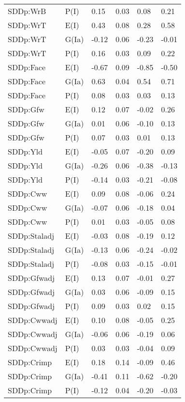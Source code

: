 \begin{center}
\begin{longtable}{|p{1.1in}|p{0.7in}|p{0.7in}|p{0.6in}|p{0.6in}|p{0.6in}|}
  SDDp:WrB & P(I) & 0.15 & 0.03 & 0.08 & 0.21 \\ 
  SDDp:WrT & E(I) & 0.43 & 0.08 & 0.28 & 0.58 \\ 
  SDDp:WrT & G(Ia) & -0.12 & 0.06 & -0.23 & -0.01 \\ 
  SDDp:WrT & P(I) & 0.16 & 0.03 & 0.09 & 0.22 \\ 
  SDDp:Face & E(I) & -0.67 & 0.09 & -0.85 & -0.50 \\ 
  SDDp:Face & G(Ia) & 0.63 & 0.04 & 0.54 & 0.71 \\ 
  SDDp:Face & P(I) & 0.08 & 0.03 & 0.03 & 0.13 \\ 
  SDDp:Gfw & E(I) & 0.12 & 0.07 & -0.02 & 0.26 \\ 
  SDDp:Gfw & G(Ia) & 0.01 & 0.06 & -0.10 & 0.13 \\ 
  SDDp:Gfw & P(I) & 0.07 & 0.03 & 0.01 & 0.13 \\ 
  SDDp:Yld & E(I) & -0.05 & 0.07 & -0.20 & 0.09 \\ 
  SDDp:Yld & G(Ia) & -0.26 & 0.06 & -0.38 & -0.13 \\ 
  SDDp:Yld & P(I) & -0.14 & 0.03 & -0.21 & -0.08 \\ 
  SDDp:Cww & E(I) & 0.09 & 0.08 & -0.06 & 0.24 \\ 
  SDDp:Cww & G(Ia) & -0.07 & 0.06 & -0.18 & 0.04 \\ 
  SDDp:Cww & P(I) & 0.01 & 0.03 & -0.05 & 0.08 \\ 
  SDDp:Staladj & E(I) & -0.03 & 0.08 & -0.19 & 0.12 \\ 
  SDDp:Staladj & G(Ia) & -0.13 & 0.06 & -0.24 & -0.02 \\ 
  SDDp:Staladj & P(I) & -0.08 & 0.03 & -0.15 & -0.01 \\ 
  SDDp:Gfwadj & E(I) & 0.13 & 0.07 & -0.01 & 0.27 \\ 
  SDDp:Gfwadj & G(Ia) & 0.03 & 0.06 & -0.09 & 0.15 \\ 
  SDDp:Gfwadj & P(I) & 0.09 & 0.03 & 0.02 & 0.15 \\ 
  SDDp:Cwwadj & E(I) & 0.10 & 0.08 & -0.05 & 0.25 \\ 
  SDDp:Cwwadj & G(Ia) & -0.06 & 0.06 & -0.19 & 0.06 \\ 
  SDDp:Cwwadj & P(I) & 0.03 & 0.03 & -0.04 & 0.09 \\ 
  SDDp:Crimp & E(I) & 0.18 & 0.14 & -0.09 & 0.46 \\ 
  SDDp:Crimp & G(Ia) & -0.41 & 0.11 & -0.62 & -0.20 \\ 
  SDDp:Crimp & P(I) & -0.12 & 0.04 & -0.20 & -0.03 \\ 

\end{longtable}
\end{center}
